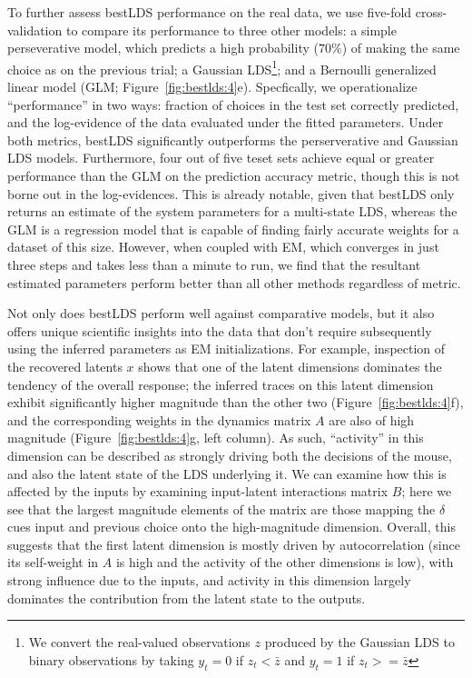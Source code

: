 To further assess bestLDS performance on the real data, we use five-fold cross-validation to compare its performance to three other models: a simple perseverative model, which predicts a high probability ($70\%$) of making the same choice as on the previous trial; a Gaussian LDS\footnote{We convert the real-valued observations $z$ produced by the Gaussian LDS to binary observations by taking $y_t=0$ if $z_t < \bar{z}$ and $y_t=1$ if $z_t >= \bar{z}$}; and a Bernoulli generalized linear model (GLM; Figure~\ref{fig:bestlds:4}e). Specfically, we operationalize ``performance'' in two ways: fraction of choices in the test set correctly predicted, and the log-evidence of the data evaluated under the fitted parameters. Under both metrics, bestLDS significantly outperforms the perserverative and Gaussian LDS models. Furthermore, four out of five teset sets achieve equal or greater performance than the GLM on the prediction accuracy metric, though this is not borne out in the log-evidences. This is already notable, given that bestLDS only returns an estimate of the system parameters for a multi-state LDS, whereas the GLM is a regression model that is capable of finding fairly accurate weights for a dataset of this size. However, when coupled with EM, which converges in just three steps and takes less than a minute to run, we find that the resultant estimated parameters perform better than all other methods regardless of metric.

Not only does bestLDS perform well against comparative models, but it also offers unique scientific insights into the data that don't require subsequently using the inferred parameters as EM initializations. For example, inspection of the recovered latents $x$ shows that one of the latent dimensions dominates the tendency of the overall response; the inferred traces on this latent dimension exhibit significantly higher magnitude than the other two (Figure~\ref{fig:bestlds:4}f), and the corresponding weights in the dynamics matrix $A$ are also of high magnitude (Figure~\ref{fig:bestlds:4}g, left column). As such, ``activity'' in this dimension can be described as strongly driving both the decisions of the mouse, and also the latent state of the LDS underlying it. We can examine how this is affected by the inputs by examining input-latent interactions matrix $B$; here we see that the largest magnitude elements of the matrix are those mapping the $\delta$ cues input and previous choice onto the high-magnitude dimension. Overall, this suggests that the first latent dimension is mostly driven by autocorrelation (since its self-weight in $A$ is high and the activity of the other dimensions is low), with strong influence due to the inputs, and activity in this dimension largely dominates the contribution from the latent state to the outputs.  

